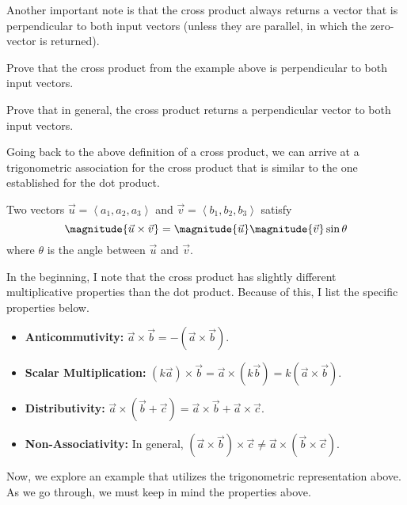 \documentclass[12pt]{scrartcl}
\begin{document}
\begin{remark}
    Another important note is that the cross product always returns a vector that is perpendicular to both input vectors (unless they are parallel, in which the zero-vector is returned).
\end{remark}

\begin{exercise}
    Prove that the cross product from the example above is perpendicular to both input vectors.
\end{exercise}

\begin{exercise}
    Prove that in general, the cross product returns a perpendicular vector to both input vectors.
\end{exercise}

Going back to the above definition of a cross product, we can arrive at a trigonometric association for the cross product that is similar to the one established for the dot product.

\begin{proposition}
    Two vectors $\vec{u} = \left<a_{1}, a_{2}, a_{3}\right>$ and $\vec{v} = \left<b_{1}, b_{2}, b_{3}\right>$ satisfy
    \[\magnitude{\vec{u} \times \vec{v}} = \magnitude{\vec{u}} \magnitude{\vec{v}} \sin\theta\]
    where $\theta$ is the angle between $\vec{u}$ and $\vec{v}$.
\end{proposition}

In the beginning, I note that the cross product has slightly different multiplicative properties than the dot product. Because of this, I list the specific properties below.

\begin{itemize}
    \item \textbf{Anticommutivity:} $\vec{a} \times \vec{b} = -(\vec{a} \times \vec{b})$.
    \item \textbf{Scalar Multiplication:} $(k\vec{a}) \times \vec{b} = \vec{a} \times (k\vec{b}) = k(\vec{a} \times \vec{b})$.
    \item \textbf{Distributivity:} $\vec{a} \times (\vec{b} + \vec{c}) = \vec{a} \times \vec{b} + \vec{a} \times \vec{c}$.
    \item \textbf{Non-Associativity:} In general, $(\vec{a} \times \vec{b}) \times \vec{c} \neq \vec{a} \times (\vec{b} \times \vec{c})$.
\end{itemize}

Now, we explore an example that utilizes the trigonometric representation above. As we go through, we must keep in mind the properties above.
\end{document}
